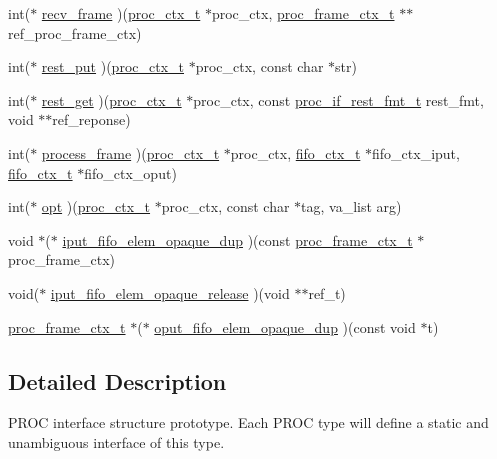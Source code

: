 \begin{DoxyCompactItemize}
\item 
int($\ast$ \hyperlink{structproc__if__s_a43115b2b1fa63fbfca191c18f28f2fea}{recv\+\_\+frame} )(\hyperlink{proc_8h_ae264f89be30fc03f5053bc16d58cba05}{proc\+\_\+ctx\+\_\+t} $\ast$proc\+\_\+ctx, \hyperlink{structproc__frame__ctx__s}{proc\+\_\+frame\+\_\+ctx\+\_\+t} $\ast$$\ast$ref\+\_\+proc\+\_\+frame\+\_\+ctx)
\item 
int($\ast$ \hyperlink{structproc__if__s_acb4d2c240c52904ebd6904f54b1a9b78}{rest\+\_\+put} )(\hyperlink{proc_8h_ae264f89be30fc03f5053bc16d58cba05}{proc\+\_\+ctx\+\_\+t} $\ast$proc\+\_\+ctx, const char $\ast$str)
\item 
int($\ast$ \hyperlink{structproc__if__s_a1e45b33c52b931954f7a0d8a14f0db53}{rest\+\_\+get} )(\hyperlink{proc_8h_ae264f89be30fc03f5053bc16d58cba05}{proc\+\_\+ctx\+\_\+t} $\ast$proc\+\_\+ctx, const \hyperlink{proc__if_8h_a9bea3dae53a91f2a3e3a459d1d3e22b3}{proc\+\_\+if\+\_\+rest\+\_\+fmt\+\_\+t} rest\+\_\+fmt, void $\ast$$\ast$ref\+\_\+reponse)
\item 
int($\ast$ \hyperlink{structproc__if__s_ab67b4061f94b6f15ae40c796b6b33597}{process\+\_\+frame} )(\hyperlink{proc_8h_ae264f89be30fc03f5053bc16d58cba05}{proc\+\_\+ctx\+\_\+t} $\ast$proc\+\_\+ctx, \hyperlink{structfifo__ctx__s}{fifo\+\_\+ctx\+\_\+t} $\ast$fifo\+\_\+ctx\+\_\+iput, \hyperlink{structfifo__ctx__s}{fifo\+\_\+ctx\+\_\+t} $\ast$fifo\+\_\+ctx\+\_\+oput)
\item 
int($\ast$ \hyperlink{structproc__if__s_a4ca0939d6721f368d2560851197fca36}{opt} )(\hyperlink{proc_8h_ae264f89be30fc03f5053bc16d58cba05}{proc\+\_\+ctx\+\_\+t} $\ast$proc\+\_\+ctx, const char $\ast$tag, va\+\_\+list arg)
\item 
void $\ast$($\ast$ \hyperlink{structproc__if__s_a558cec57df436699d4154775894f2313}{iput\+\_\+fifo\+\_\+elem\+\_\+opaque\+\_\+dup} )(const \hyperlink{structproc__frame__ctx__s}{proc\+\_\+frame\+\_\+ctx\+\_\+t} $\ast$proc\+\_\+frame\+\_\+ctx)
\item 
void($\ast$ \hyperlink{structproc__if__s_aec3bf948ff945ac2f5a4c834ea3b57da}{iput\+\_\+fifo\+\_\+elem\+\_\+opaque\+\_\+release} )(void $\ast$$\ast$ref\+\_\+t)
\item 
\hyperlink{structproc__frame__ctx__s}{proc\+\_\+frame\+\_\+ctx\+\_\+t} $\ast$($\ast$ \hyperlink{structproc__if__s_a7806bbda25988d9ee54f6d0bb143c697}{oput\+\_\+fifo\+\_\+elem\+\_\+opaque\+\_\+dup} )(const void $\ast$t)
\end{DoxyCompactItemize}


\subsection{Detailed Description}
P\+R\+OC interface structure prototype. Each P\+R\+OC type will define a static and unambiguous interface of this type. 

